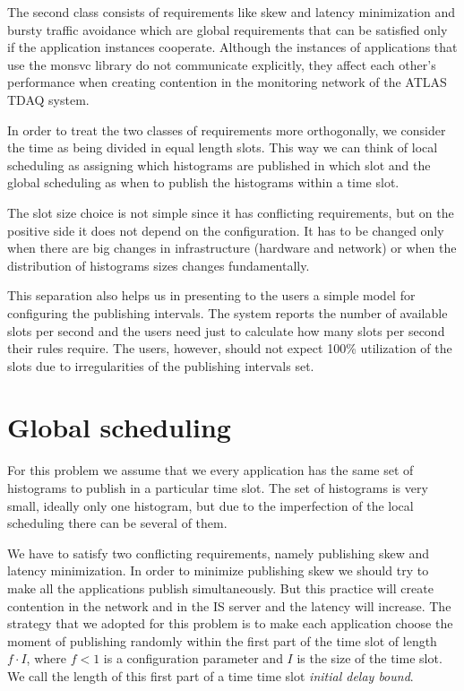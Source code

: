 The second class consists of requirements like skew and latency minimization and bursty traffic avoidance which are global requirements that can be satisfied only if the application instances cooperate. Although the instances of applications that use the monsvc library do not communicate explicitly, they affect each other's performance when creating contention in the monitoring network of the ATLAS TDAQ system. 

In order to treat the two classes of requirements more orthogonally, we consider the time as being divided in equal length slots. This way we can think of local scheduling as assigning which histograms are published in which slot and the global scheduling as when to publish the histograms within a time slot.

The slot size choice is not simple since it has conflicting requirements, but on the positive side it does not depend on the configuration. It has to be changed only when there are big changes in infrastructure (hardware and network) or when the distribution of histograms sizes changes fundamentally.

This separation also helps us in presenting to the users a simple model for configuring the publishing intervals. The system reports the number of available slots per second and the users need just to calculate how many slots per second their rules require. The users, however, should not expect 100\% utilization of the slots due to irregularities of the publishing intervals set.

\section{Global scheduling}

For this problem we assume that we every application has the same set of histograms to publish in a particular time slot. The set of histograms is very small, ideally only one histogram, but due to the imperfection of the local scheduling there can be several of them.

We have to satisfy two conflicting requirements, namely publishing skew and latency minimization. In order to minimize publishing skew we should try to make all the applications publish simultaneously. But this practice will create contention in the network and in the IS server and the latency will increase. 
The strategy that we adopted for this problem is to make each application choose the moment of publishing randomly within the first part of the time slot of length $f\cdot I$, where $f<1$ is a configuration parameter and $I$ is the size of the time slot. We call the length of this first part of a time time slot \emph{initial delay bound}.

